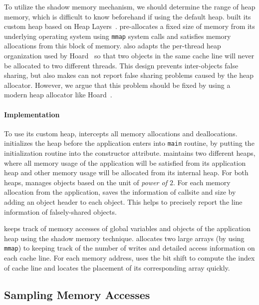 To utilize the shadow memory mechanism, we should determine the range of heap memory, which is difficult to know beforehand if using the default heap. \cheetah{} built its custom heap based on Heap Layers~\cite{Berger:2001:CHM:378795.378821}. \cheetah{} pre-allocates a fixed size of memory
from its underlying operating system using \texttt{mmap} system calls and satisfies memory allocations from this block of memory. \cheetah{} also adapts the per-thread heap organization used by Hoard~\cite{Hoard} so that two objects in the same cache line will never be allocated to two different threads. This design prevents inter-objects false sharing, but also makes \cheetah{} can not report false sharing problems caused by the heap allocator.  However, we argue that this problem should be fixed by using a modern heap allocator like Hoard~\cite{Hoard}. 

\paragraph{Implementation} 
To use its custom heap, \cheetah{} intercepts all memory allocations and deallocations. \cheetah{} initializes the heap before the application enters into \texttt{main} routine, by putting the initialization routine into the constructor attribute. \cheetah{} maintains two different heaps, where all memory usage of the application will be satisfied from its application heap and other memory usage will be allocated from its  internal heap. For both heaps, \cheetah{} manages objects based on the unit of {\it power of $2$}. For each memory allocation from the application, \cheetah{} saves the information of callsite and size by adding an object header to each object. This helps \cheetah{} to precisely report the line information of falsely-shared objects.  

\cheetah{} keeps track of memory accesses of global variables and objects of the application heap using the shadow memory technique. \Cheetah{} allocates two large arrays (by using \texttt{mmap}) to keeping track of the number of writes and detailed access information on each cache line. For each memory address, \cheetah{} uses the bit shift to compute the index of cache line and locates the placement of its corresponding array quickly. 

\subsection{Sampling Memory Accesses}
\label{sec:perfcounter}

